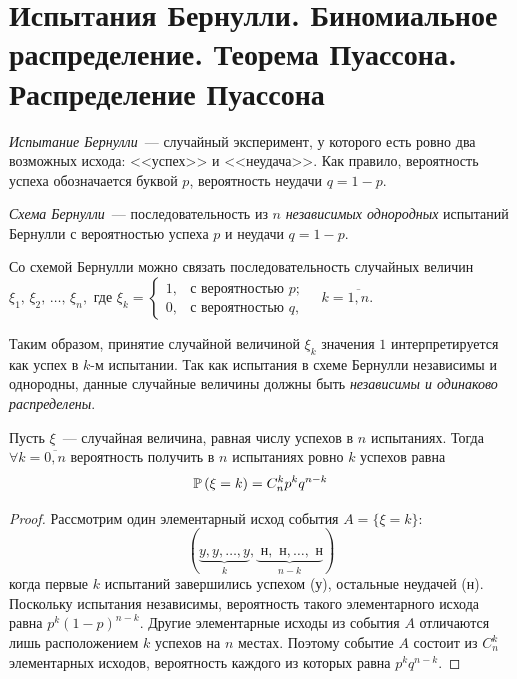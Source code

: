 \section{Испытания Бернулли. Биномиальное распределение. Теорема Пуассона. Распределение Пуассона}
\begin{defn}
    \textit{Испытание Бернулли}~--- случайный эксперимент, у которого есть ровно два возможных 
    исхода: <<успех>> и <<неудача>>. 
    Как правило, вероятность успеха обозначается буквой $p$, вероятность неудачи $q = 1 - p$.
\end{defn}

\begin{defn}
    \textit{Схема Бернулли}~--- последовательность из $n$ \textit{независимых однородных} испытаний Бернулли с вероятностью успеха $p$ и неудачи $q = 1 - p$.
\end{defn}

Со схемой Бернулли можно связать последовательность случайных величин $\xi_1,\, \xi_2,\, \ldots,\, \xi_n,$ где 
$\xi_k = 
    \begin{cases} 
        1, &\text{с вероятностью } p; \\ 
        0, & \text{с вероятностью } q,
    \end{cases} 
    \quad k = \overline{1, n}$.

Таким образом, принятие случайной величиной $\xi_k$ значения $1$ интерпретируется как успех в $k$-м испытании.
Так как испытания в схеме Бернулли независимы и однородны, данные случайные величины должны быть \textit{независимы и одинаково распределены}.

\begin{namedthm}
    Пусть $\xi$~--- случайная величина, равная числу успехов в $n$ испытаниях. Тогда $\forall k = \overline{0,n}$ вероятность получить в $n$ испытаниях ровно $k$ успехов равна
    \begin{equation*}
        \operatorname{\mathbb{P}}\left(\xi=k\right)=C_{n}^{k} p^{k} q^{n-k}
    \end{equation*}
    \end{namedthm}
    
    \begin{proof}
    Рассмотрим один элементарный исход события $A = \{\xi = k \}$:
    \begin{equation*}
        (\underbrace{y, y, \ldots, y}_{k}, \underbrace{\textit{ н}, \textit{ н}, \ldots,\textit{ н}}_{n-k})
    \end{equation*}
    когда первые $k$ испытаний завершились успехом (у), остальные неудачей (н). Поскольку испытания независимы, вероятность такого элементарного исхода равна $p^k(1 - p)^{n-k}.$ Другие элементарные исходы из события $A$ отличаются лишь расположением $k$ успехов на $n$ местах. Поэтому событие $A$ состоит из $C_n^k$ элементарных исходов, вероятность каждого из которых равна $p^kq^{n-k}$.
    \end{proof}
    
